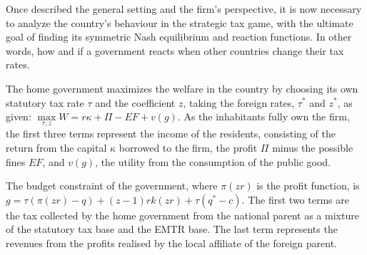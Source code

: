 
Once described the general setting and the firm's perspective, it is now necessary to analyze the country's behaviour in the strategic tax game, with the ultimate goal of finding its symmetric Nash equilibrium and reaction functions. In other words, how and if a government reacts when other countries change their tax rates.

The home government maximizes the welfare in the country by choosing its own statutory tax rate $\tau$ and the coefficient $z$, taking the foreign rates, $\tau^*$ and $z^*$, as given: $\max\limits_{\tau,z}W=r\kappa+\Pi-EF+v(g)$. As the inhabitants fully own the firm, the first three terms represent the income of the residents, consisting of the return from the capital $\kappa$ borrowed to the firm, the profit $\Pi$ minus the possible fines $EF$, and $v(g)$, the utility from the consumption of the public good.


The budget constraint of the government, where $\pi(zr)$ is the profit function, is $g=\tau(\pi(zr)-q)+(z-1)rk(zr)+\tau(q^*-c)$. The first two terms are the tax collected by the home government from the national parent as a mixture of the statutory tax base and the EMTR base. The last term represents the revenues from the profits realised by the local affiliate of the foreign parent.

